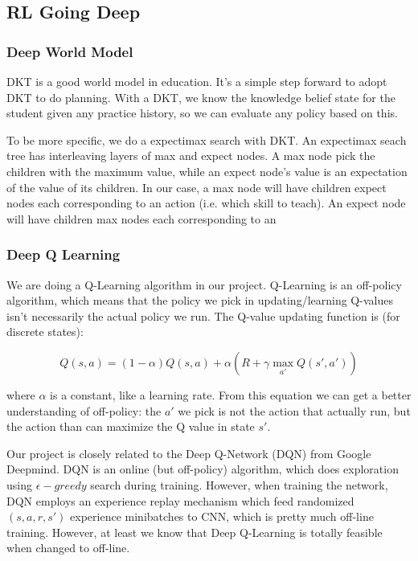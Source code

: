 \subsection{RL Going Deep}

\subsubsection{Deep World Model}

DKT is a good world model in education. It's a simple step forward to adopt DKT to do planning. With a DKT, we know the knowledge belief state for the student given any practice history, so we can evaluate any policy based on this.

To be more specific, we do a expectimax search with DKT. An expectimax seach tree has interleaving layers of max and expect nodes. A max node pick the children with the maximum value, while an expect node's value is an expectation of the value of its children. In our case, a max node will have children expect nodes each corresponding to an action (i.e. which skill to teach). An expect node will have children max nodes each corresponding to an 

\subsubsection{Deep Q Learning}

We are doing a Q-Learning algorithm in our project. Q-Learning is an off-policy algorithm, which means that the policy we pick in updating/learning Q-values isn't necessarily the actual policy we run. The Q-value updating function is (for discrete states):

\begin{equation*}
    Q(s,a)= (1-\alpha)Q(s,a) + \alpha(R+\gamma\max\limits_{a'}Q(s',a'))
\end{equation*}

where $\alpha$ is a constant, like a learning rate. From this equation we can get a better understanding of off-policy: the $a'$ we pick is not the action that actually run, but the action than can maximize the Q value in state $s'$.

Our project is closely related to the Deep Q-Network (DQN) from Google Deepmind. DQN is an online (but off-policy) algorithm, which does exploration using $\epsilon-greedy$ search during training. However, when training the network, DQN employs an experience replay mechanism which feed randomized $(s, a, r, s')$ experience minibatches to CNN, which is pretty much off-line training.  However, at least we know that Deep Q-Learning is totally feasible when changed to off-line.

